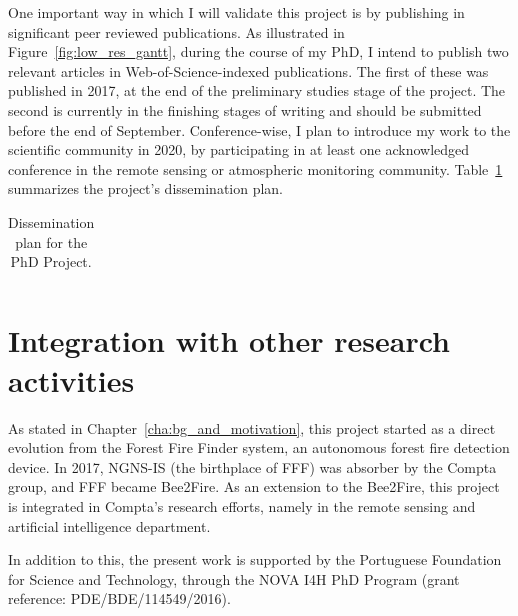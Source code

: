 One important way in which I will validate this project is by publishing
in significant peer reviewed publications. As illustrated in
Figure~\ref{fig:low_res_gantt}, during the course of my PhD, I intend to
publish two relevant articles in Web-of-Science-indexed publications.
The first of these was published in 2017, at the end of the preliminary
studies stage of the project. The second is currently in the finishing
stages of writing and should be submitted before the end of September.
Conference-wise, I plan to introduce my work to the scientific community
in 2020, by participating in at least one acknowledged conference in the
remote sensing or atmospheric monitoring community.
Table~\ref{tab:dissemination_plan} summarizes the project's
dissemination plan.

\begin{table}[htpb]
    \centering
    \caption{Dissemination plan for the PhD Project.}
    \label{tab:dissemination_plan}
    \begin{tabular}{c}
    
    \end{tabular}
\end{table}




\section{Integration with other research activities}%
\label{sec:integration_with_other_research_activities}

As stated in Chapter~\ref{cha:bg_and_motivation}, this project started
as a direct evolution from the Forest Fire Finder system, an autonomous
forest fire detection device. In 2017, NGNS-IS (the birthplace of
\gls{FFF}) was absorber by the Compta group, and \gls{FFF} became
Bee2Fire. As an extension to the Bee2Fire, this project is integrated in
Compta's research efforts, namely in the remote sensing and artificial
intelligence department. 

In addition to this, the present work is supported by the Portuguese
Foundation for Science and Technology, through the NOVA I4H PhD Program
(grant reference: PDE/BDE/114549/2016).






